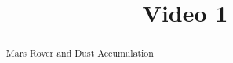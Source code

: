 \documentclass[handout]{ximera}
\title{Video 1}
\begin{document}
\begin{abstract}
Mars Rover and Dust Accumulation
\end{abstract}

\maketitle

\end{document}

